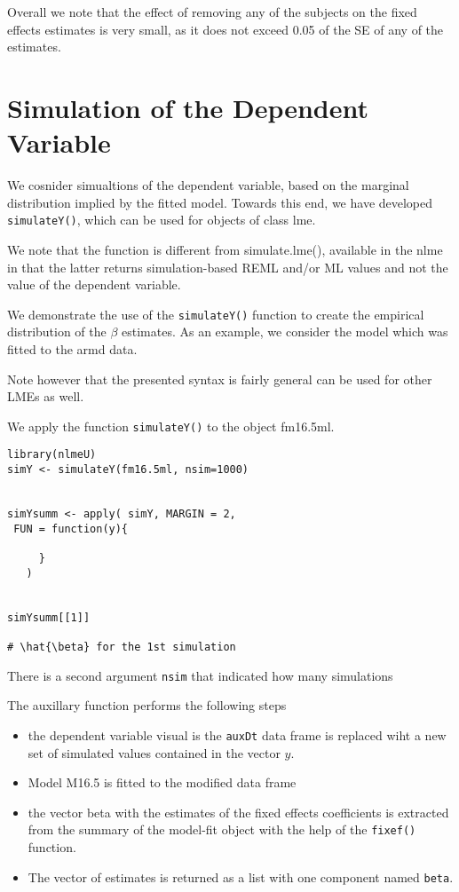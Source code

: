 \documentclass[a4paper,12pt]{article}
\begin{document}

Overall we note that the effect of removing any of the subjects on the fixed effects estimates is very small, as it does not exceed 0.05 of the SE of any of the  estimates.

\section{Simulation of the Dependent Variable}

We cosnider simualtions of the dependent variable, based on the marginal distribution 
implied by the fitted model.
Towards this end, we have developed \texttt{simulateY()}, which can be used for objects of class lme.

We note that the function is different from simulate.lme(), available in the nlme in that the latter returns
simulation-based REML and/or ML values and not the value of the dependent variable.

We demonstrate the use of the \texttt{simulateY()} function to create the empirical distribution of the \textbf{$\beta$} estimates.
As an example, we consider the model which was fitted to the armd data.

Note however that the presented syntax is fairly general can be used for other LMEs as well.

We apply the function \texttt{simulateY()} to the object fm16.5ml.



\begin{framed}
\begin{verbatim}
library(nlmeU)
simY <- simulateY(fm16.5ml, nsim=1000)


simYsumm <- apply( simY, MARGIN = 2, 
 FUN = function(y){

     }
   )


simYsumm[[1]]

# \hat{\beta} for the 1st simulation
\end{verbatim}
\end{framed}

There is a second argument \texttt{nsim} that indicated how many simulations 

The auxillary function performs the following steps

\begin{itemize}
\item the dependent variable visual is the \texttt{auxDt} data frame is replaced wiht a new set of simulated values contained in the vector $y$.
\item Model M16.5 is fitted to the modified data frame
\item the vector beta with the estimates of the fixed effects coefficients is extracted from the summary of the model-fit object with the help of the \texttt{fixef()} function.
\item The vector of estimates is returned as a list with one component named \texttt{beta}.
\end{itemize}
\end{document}
